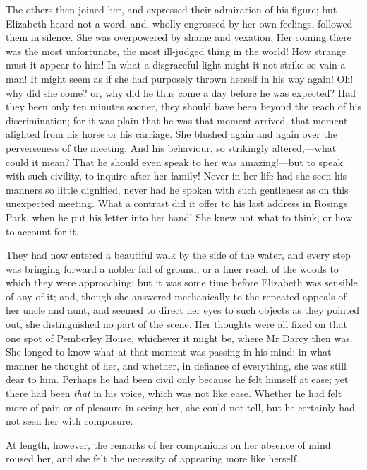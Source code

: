 The others then joined her, and expressed their admiration of his figure; but Elizabeth heard not a word, and, wholly engrossed by her own feelings, followed them in silence. She was overpowered by shame and vexation. Her coming there was the most unfortunate, the most ill-judged thing in the world! How strange must it appear to him! In what a disgraceful light might it not strike so vain a man! It might seem as if she had purposely thrown herself in his way again! Oh! why did she come? or, why did he thus come a day before he was expected? Had they been only ten minutes sooner, they should have been beyond the reach of his discrimination; for it was plain that he was that moment arrived, that moment alighted from his horse or his carriage. She blushed again and again over the perverseness of the meeting. And his behaviour, so strikingly altered,—what could it mean? That he should even speak to her was amazing!—but to speak with such civility, to inquire after her family! Never in her life had she seen his manners so little dignified, never had he spoken with such gentleness as on this unexpected meeting. What a contrast did it offer to his last address in Rosings Park, when he put his letter into her hand! She knew not what to think, or how to account for it.

They had now entered a beautiful walk by the side of the water, and every step was bringing forward a nobler fall of ground, or a finer reach of the woods to which they were approaching: but it was some time before Elizabeth was sensible of any of it; and, though she answered mechanically to the repeated appeals of her uncle and aunt, and seemed to direct her eyes to such objects as they pointed out, she distinguished no part of the scene. Her thoughts were all fixed on that one spot of Pemberley House, whichever it might be, where Mr Darcy then was. She longed to know what at that moment was passing in his mind; in what manner he thought of her, and whether, in defiance of everything, she was still dear to him. Perhaps he had been civil only because he felt himself at ease; yet there had been \textit{that} in his voice, which was not like ease. Whether he had felt more of pain or of pleasure in seeing her, she could not tell, but he certainly had not seen her with composure.

At length, however, the remarks of her companions on her absence of mind roused her, and she felt the necessity of appearing more like herself.


